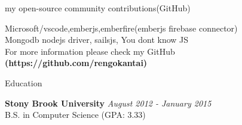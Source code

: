 \documentclass{resume} %
\begin{document}
\begin{rSection}{my open-source community contributions(GitHub)}

Microsoft/vscode,emberjs,emberfire(emberjs firebase connector) \\
Mongodb nodejs driver,  sailsjs, You dont know JS \\
For more information please check my GitHub {\bf (https://github.com/rengokantai)}


\end{rSection}














\begin{rSection}{Education}

{\bf Stony Brook University} \hfill {\em August 2012 - January 2015} \\ 
B.S. in Computer Science (GPA: 3.33)  \\
\end{rSection}
\end{document}
